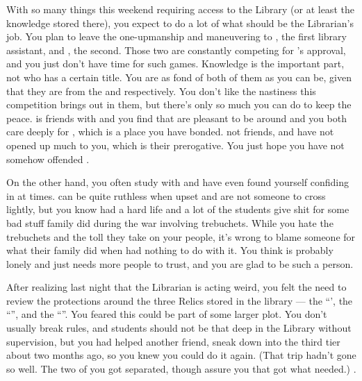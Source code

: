\documentclass[char]{GL2020}
\begin{document}
With so many things this weekend requiring access to the Library (or at least the knowledge stored there), you expect to do a lot of what should be the Librarian’s job. You plan to leave the one-upmanship and maneuvering to \cAmbition{\full}, the first library assistant, and \cLibAssist{\full}, the second. Those two are constantly competing for \cLibrarian{}’s approval, and you just don’t have time for such games. Knowledge is the important part, not who has a certain title. You are as fond of both of them as you can be, given that they are from the \pTech{} and \pFarm{} respectively. You don't like the nastiness this competition brings out in them, but there's only so much you can do to keep the peace. \cAmbition{} is friends with \cHeir{} and you find that \cAmbition{\they} are pleasant to be around and you both care deeply for \cHeir{}, which is a place you have bonded. \cAmbition{\They} \cAmbition{\are} not friends, and have not opened up much to you, which is their prerogative. You just hope you have not somehow offended \cAmbition{\them}.

On the other hand, you often study with \cLibAssist{} and have even found yourself confiding in \cLibAssist{\them} at times. \cLibAssist{\They} can be quite ruthless when upset and are not someone to cross lightly, but you know \cLibAssist{\they} \cLibAssist{\have} had a hard life and a lot of the students give \cLibAssist{\them} shit for some bad stuff \cLibAssist{\their} family did during the war involving trebuchets. While you hate the trebuchets and the toll they take on your people, it's wrong to blame someone for what their family did when \cLibAssist{\they} had nothing to do with it. You think \cLibAssist{} is probably lonely and just needs more people to trust, and you are glad to be such a person. 

After realizing last night that the Librarian is acting weird, you felt the need to review the protections around the three Relics stored in the library — the ``\iNet{}', the ``\iLariat{}'', and the ``\iScythe{}''. You feared this could be part of some larger plot. You don't usually break rules, and students should not be that deep in the Library without supervision, but you had helped another friend, \cChupStudent{\full} sneak down into the third tier about two months ago, so you knew you could do it again. (That trip hadn’t gone so well. The two of you got separated, though \cChupStudent{\they} assure\cChupStudent{\verbs} you that \cChupStudent{\they} got what \cChupStudent{\they} needed.) . 
\end{document}
